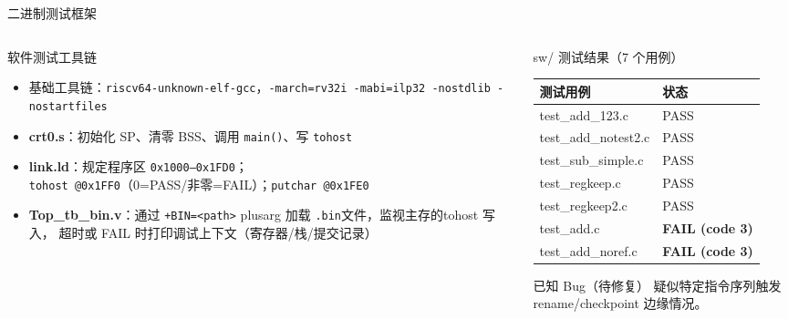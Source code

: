\documentclass[aspectratio=169,xcolor={dvipsnames,svgnames},10pt]{beamer}
\newcommand{\code}[1]{\texttt{\small\color{PrimaryBlue}#1}}
\begin{document}
\begin{frame}{二进制测试框架}
  \begin{columns}[T]
    \begin{column}{0.52\textwidth}
      \begin{block}{软件测试工具链}
        \footnotesize
        \begin{itemize}
          \item 基础工具链：\code{riscv64-unknown-elf-gcc}，\code{-march=rv32i -mabi=ilp32 -nostdlib -nostartfiles}
          \item \textbf{crt0.s}：初始化 SP、清零 BSS、调用 \code{main()}、写 \code{tohost}
          \item \textbf{link.ld}：规定程序区 \code{0x1000–0x1FD0}；\\
                \code{tohost @0x1FF0}（0=PASS/非零=FAIL）；\code{putchar @0x1FE0}
          \item \textbf{Top\_tb\_bin.v}：通过 \code{+BIN=<path>} plusarg 加载 \code{.bin}文件，监视主存的tohost 写入，
                超时或 FAIL 时打印调试上下文（寄存器/栈/提交记录）
        \end{itemize}
      \end{block}
    \end{column}
    \begin{column}{0.44\textwidth}
      \begin{block}{sw/ 测试结果（7 个用例）}
        \footnotesize\renewcommand{\arraystretch}{1.15}
        \begin{tabular}{ll}
          \toprule
          \textbf{测试用例} & \textbf{状态} \\
          \midrule
          test\_add\_123.c     & PASS \\
          test\_add\_notest2.c & PASS \\
          test\_sub\_simple.c  & PASS \\
          test\_regkeep.c      & PASS \\
          test\_regkeep2.c     & PASS \\
          \midrule
          test\_add.c          & \textcolor{AccentRed}{\bfseries FAIL (code 3)} \\
          test\_add\_noref.c   & \textcolor{AccentRed}{\bfseries FAIL (code 3)} \\
          \bottomrule
        \end{tabular}
      \end{block}
      \vspace{0.08cm}
      \begin{alertblock}{已知 Bug（待修复）}
        疑似特定指令序列触发 rename/checkpoint 边缘情况。
      \end{alertblock}
    \end{column}
  \end{columns}
\end{frame}
\end{document}
